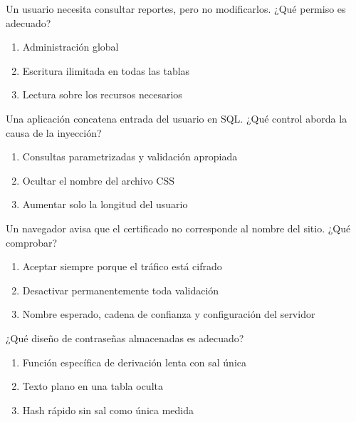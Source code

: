 \noindent\begin{minipage}{\linewidth}\setlength{\parskip}{4pt}\label{q:R-072}
Un usuario necesita consultar reportes, pero no modificarlos. ¿Qué permiso es adecuado?
\begin{enumerate}[label=\Alph*),nosep]
\item Administración global
\item Escritura ilimitada en todas las tablas
\item Lectura sobre los recursos necesarios
\end{enumerate}\end{minipage}\par\medskip

\noindent\begin{minipage}{\linewidth}\setlength{\parskip}{4pt}\label{q:R-073}
Una aplicación concatena entrada del usuario en SQL. ¿Qué control aborda la causa de la inyección?
\begin{enumerate}[label=\Alph*),nosep]
\item Consultas parametrizadas y validación apropiada
\item Ocultar el nombre del archivo CSS
\item Aumentar solo la longitud del usuario
\end{enumerate}\end{minipage}\par\medskip

\noindent\begin{minipage}{\linewidth}\setlength{\parskip}{4pt}\label{q:R-074}
Un navegador avisa que el certificado no corresponde al nombre del sitio. ¿Qué comprobar?
\begin{enumerate}[label=\Alph*),nosep]
\item Aceptar siempre porque el tráfico está cifrado
\item Desactivar permanentemente toda validación
\item Nombre esperado, cadena de confianza y configuración del servidor
\end{enumerate}\end{minipage}\par\medskip

\noindent\begin{minipage}{\linewidth}\setlength{\parskip}{4pt}\label{q:R-075}
¿Qué diseño de contraseñas almacenadas es adecuado?
\begin{enumerate}[label=\Alph*),nosep]
\item Función específica de derivación lenta con sal única
\item Texto plano en una tabla oculta
\item Hash rápido sin sal como única medida
\end{enumerate}\end{minipage}\par\medskip

